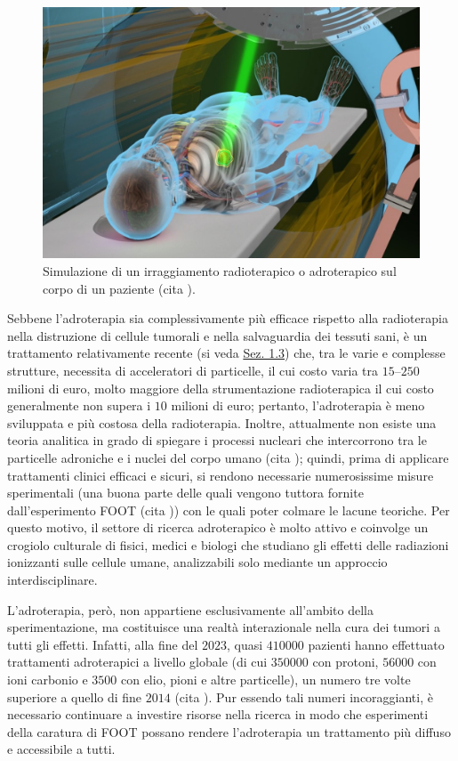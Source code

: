 \documentclass[12pt,a4paper,twoside]{report}
\begin{document}
	\begin{figure}[H]
		\centering
		\includegraphics[width=0.9\linewidth]{simulation.jpg}
		\caption{Simulazione di un irraggiamento radioterapico o adroterapico sul corpo di un paziente (cita
			).}
		\label{fig:simulation}
	\end{figure}
	
	Sebbene l'adroterapia sia complessivamente più efficace rispetto alla radioterapia nella distruzione di cellule tumorali e nella salvaguardia dei tessuti sani, è un trattamento relativamente recente (si veda \hyperref[storia_adroterapia]{Sez. 1.3}) che, tra le varie e complesse strutture, necessita di acceleratori di particelle, il cui costo varia tra $15$--$250$ milioni di euro, molto maggiore della strumentazione radioterapica il cui costo generalmente non supera i $10$ milioni di euro; pertanto, l'adroterapia è meno sviluppata e più costosa della radioterapia. Inoltre, attualmente non esiste una teoria analitica in grado di spiegare i processi nucleari che intercorrono tra le particelle adroniche e i nuclei del corpo umano (cita
	); quindi, prima di applicare trattamenti clinici efficaci e sicuri, si rendono necessarie numerosissime misure sperimentali (una buona parte delle quali vengono tuttora fornite dall'esperimento FOOT (cita
	)) con le quali poter colmare le lacune teoriche. Per questo motivo, il settore di ricerca adroterapico è molto attivo e coinvolge un crogiolo culturale di fisici, medici e biologi che studiano gli effetti delle radiazioni ionizzanti sulle cellule umane, analizzabili solo mediante un approccio interdisciplinare.
	
	L'adroterapia, però, non appartiene esclusivamente all'ambito della sperimentazione, ma costituisce una realtà interazionale nella cura dei tumori a tutti gli effetti. Infatti, alla fine del $2023$, quasi $410000$ pazienti hanno effettuato trattamenti adroterapici a livello globale (di cui $350000$ con protoni, $56000$ con ioni carbonio e $3500$ con elio, pioni e altre particelle), un numero tre volte superiore a quello di fine $2014$ (cita
	). Pur essendo tali numeri incoraggianti, è necessario continuare a investire risorse nella ricerca in modo che esperimenti della caratura di FOOT possano rendere l'adroterapia un trattamento più diffuso e accessibile a tutti.
	
\end{document}
